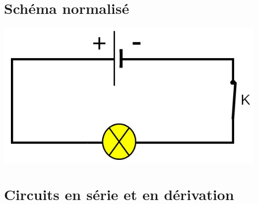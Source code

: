 \documentclass[xcolor={dvipsnames}]{beamer}
\begin{document}
\section{Schéma normalisé}
\begin{frame}
	
	
	\begin{center}
		\includegraphics[scale=0.5]{../img/schema}
	\end{center}
\end{frame}



\section{Circuits en série et en dérivation}


\begin{frame}
	
\end{frame}
\end{document}
